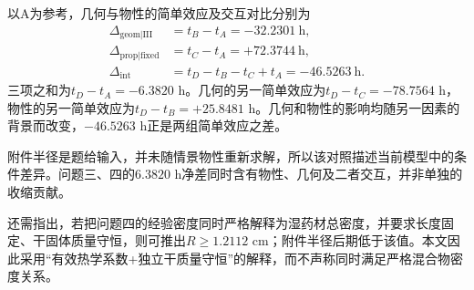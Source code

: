 以A为参考，几何与物性的简单效应及交互对比分别为
\begin{align}
\Delta_{\mathrm{geom}|\mathrm{III}}&=t_B-t_A=-32.2301\ \mathrm h,\\
\Delta_{\mathrm{prop}|\mathrm{fixed}}&=t_C-t_A=+72.3744\ \mathrm h,\\
\Delta_{\mathrm{int}}&=t_D-t_B-t_C+t_A=-46.5263\ \mathrm h.
\end{align}
三项之和为$t_D-t_A=-6.3820$ h。几何的另一简单效应为$t_D-t_C=-78.7564$ h，物性的另一简单效应为$t_D-t_B=+25.8481$ h。几何和物性的影响均随另一因素的背景而改变，$-46.5263$ h正是两组简单效应之差。

附件半径是题给输入，并未随情景物性重新求解，所以该对照描述当前模型中的条件差异。问题三、四的$6.3820$ h净差同时含有物性、几何及二者交互，并非单独的收缩贡献。

还需指出，若把问题四的经验密度同时严格解释为湿药材总密度，并要求长度固定、干固体质量守恒，则可推出$R\ge1.2112$ cm；附件半径后期低于该值。本文因此采用“有效热学系数+独立干质量守恒”的解释，而不声称同时满足严格混合物密度关系。
